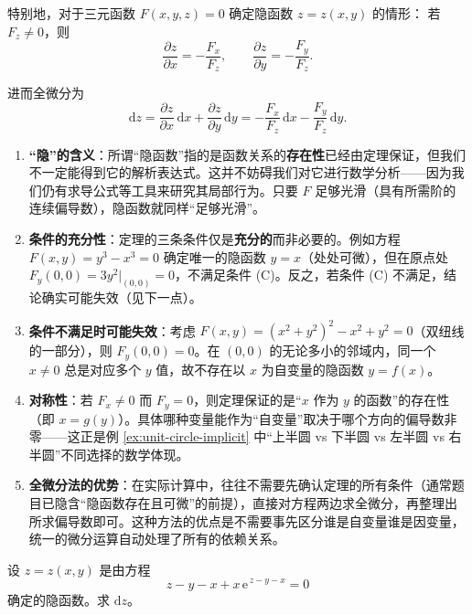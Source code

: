 \documentclass[lang=cn,11pt]{elegantbook}
\begin{document}
特别地，对于三元函数 $F(x,y,z)=0$ 确定隐函数 $z=z(x,y)$ 的情形：
若 $F_z \neq 0$，则
\[
\frac{\partial z}{\partial x}=-\frac{F_x}{F_z},\qquad
\frac{\partial z}{\partial y}=-\frac{F_y}{F_z}.
\]

进而全微分为
\[
\mathrm{d}z=\frac{\partial z}{\partial x}\,\mathrm{d}x + \frac{\partial z}{\partial y}\,\mathrm{d}y
    =-\frac{F_x}{F_z}\,\mathrm{d}x-\frac{F_y}{F_z}\,\mathrm{d}y.
\]

\begin{remark}[关于隐函数定理的若干要点]
\begin{enumerate}
  \item \textbf{“隐”的含义}：所谓“隐函数”指的是函数关系的\textbf{存在性}已经由定理保证，但我们不一定能得到它的解析表达式。这并不妨碍我们对它进行数学分析——因为我们仍有求导公式等工具来研究其局部行为。只要 $F$ 足够光滑（具有所需阶的连续偏导数），隐函数就同样“足够光滑”。
  \item \textbf{条件的充分性}：定理的三条条件仅是\textbf{充分的}而非必要的。例如方程 $F(x,y)=y^3-x^3=0$ 确定唯一的隐函数 $y=x$（处处可微），但在原点处 $F_y(0,0)=3y^2|_{(0,0)}=0$，不满足条件 (C)。反之，若条件 (C) 不满足，结论确实可能失效（见下一点）。
  \item \textbf{条件不满足时可能失效}：考虑 $F(x,y)=(x^2+y^2)^2-x^2+y^2=0$（双纽线的一部分），则 $F_y(0,0)=0$。在 $(0,0)$ 的无论多小的邻域内，同一个 $x \neq 0$ 总是对应多个 $y$ 值，故不存在以 $x$ 为自变量的隐函数 $y=f(x)$。
  \item \textbf{对称性}：若 $F_x \neq 0$ 而 $F_y=0$，则定理保证的是“$x$ 作为 $y$ 的函数”的存在性（即 $x=g(y)$）。具体哪种变量能作为“自变量”取决于哪个方向的偏导数非零——这正是例 \ref{ex:unit-circle-implicit} 中“上半圆 vs 下半圆 vs 左半圆 vs 右半圆”不同选择的数学体现。
  \item \textbf{全微分法的优势}：在实际计算中，往往不需要先确认定理的所有条件（通常题目已隐含“隐函数存在且可微”的前提），直接对方程两边求全微分，再整理出所求偏导数即可。这种方法的优点是不需要事先区分谁是自变量谁是因变量，统一的微分运算自动处理了所有的依赖关系。
\end{enumerate}
\end{remark}


\begin{exercise}[隐函数的全微分] \label{ex:implicit-dz}
设 $z=z(x,y)$ 是由方程
\[
z-y-x+x\,\mathrm{e}^{\,z-y-x}=0 \tag{$\dagger$}
\]
确定的隐函数。求 $\mathrm{d}z$。
\end{exercise}
\end{document}
